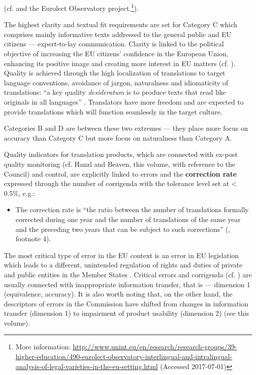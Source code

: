 \documentclass[output=paper]{langsci/langscibook}
\begin{document}
(cf. \citealt{Biel2014} and the Eurolect Observatory project.\footnote{More information: \url{http://www.unint.eu/en/research/research-groups/39-higher-education/490-eurolect-observatory-interlingual-and-intralingual-analysis-of-legal-varieties-in-the-eu-setting.html} (Accessed 2017-07-01)}).

The highest clarity and textual fit requirements are set for Category C which comprises mainly informative texts addressed to the general public and EU citizens — expert-to-lay communication. Clarity is linked to the political objective of increasing the EU citizens’ confidence in the European Union, enhancing its positive image and creating more interest in EU matters (cf. \citealt[1, 12]{DGT2015j}). Quality is achieved through the high localization of translations to target language conventions, avoidance of jargon, naturalness and idiomaticity of translations: “a key quality \textit{desideratum} is to produce texts that read like originals in all languages” \citep[2, 13]{DGT2015j}. Translators have more freedom and are expected to provide translations which will function seamlessly in the target culture. 

Categories B and D are between these two extremes — they place more focus on accuracy than Category C but more focus on naturalness than Category A.

Quality indicators for translation products, which are connected with ex-post quality monitoring (cf. Hanzl and Beaven, this volume, with reference to the Council) and control, are explicitly linked to errors and the \textbf{correction rate} expressed through the number of corrigenda with the tolerance level set at < 0.5\%, e.g.:

\begin{itemize}
\item 
The correction rate is “the ratio between the number of translations formally corrected during one year and the number of translations of the same year and the preceding two years that can be subject to such corrections” (\citealt[4]{DGT2016a}, footnote 4).
\end{itemize}

The most critical type of error in the EU context is an error in EU legislation which leads to a different, unintended regulation of rights and duties of private and public entities in the Member States \citep[2]{Kapko2005}. Critical errors and corrigenda (cf. \citealt{Bobek2009}) are usually connected with inappropriate information transfer, that is — dimension 1 (equivalence, accuracy). It is also worth noting that, on the other hand, the descriptors of errors in the Commission have shifted from changes in information transfer (dimension 1) to impairment of product usability (dimension 2) (see \citealt{Strandvik2017} this volume).
\end{document}
